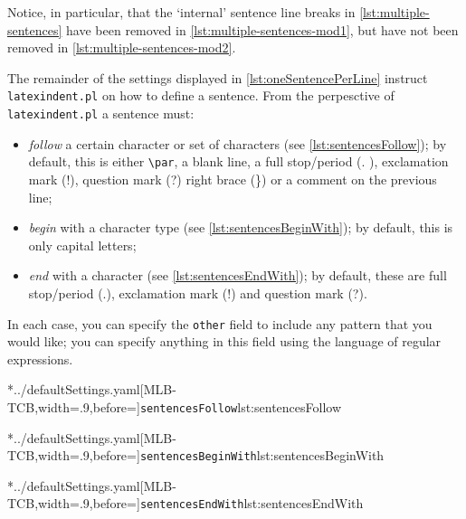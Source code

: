 	Notice, in particular, that the `internal' sentence line breaks in \cref{lst:multiple-sentences} have been removed in \cref{lst:multiple-sentences-mod1}, but have not been removed in \cref{lst:multiple-sentences-mod2}.

	The remainder of the settings displayed in \vref{lst:oneSentencePerLine} instruct \texttt{latexindent.pl} on how to define a sentence.
	From the perpesctive of \texttt{latexindent.pl} a sentence must: \begin{itemize} \item \emph{follow} a certain character or set of characters (see \cref{lst:sentencesFollow}); by default, this is either \lstinline!\par!, a blank line, a full stop/period (.
		      ), exclamation mark (!), question mark (?) right brace (\}) or a comment
		      on the previous line;
		\item \emph{begin} with a character type (see \cref{lst:sentencesBeginWith}); by default, this is only capital letters;
		\item \emph{end} with a character (see \cref{lst:sentencesEndWith}); by default, these are
		      full stop/period (.), exclamation mark (!) and question mark (?).
	\end{itemize}
	In each case, you can specify the \texttt{other} field to include any pattern that you would like; you can specify anything in this field using the language of regular expressions.

	\begin{adjustwidth}{-3.5cm}{-2.5cm}
		\begin{minipage}{.36\linewidth}
			\cmhlistingsfromfile*[style=sentencesFollow]*{../defaultSettings.yaml}[MLB-TCB,width=.9\linewidth,before=\centering]{\texttt{sentencesFollow}}{lst:sentencesFollow}
		\end{minipage}
		\hfill
		\begin{minipage}{.31\linewidth}
			\cmhlistingsfromfile*[style=sentencesBeginWith]*{../defaultSettings.yaml}[MLB-TCB,width=.9\linewidth,before=\centering]{\texttt{sentencesBeginWith}}{lst:sentencesBeginWith}
		\end{minipage}
		\hfill
		\begin{minipage}{.31\linewidth}
			\cmhlistingsfromfile*[style=sentencesEndWith]*{../defaultSettings.yaml}[MLB-TCB,width=.9\linewidth,before=\centering]{\texttt{sentencesEndWith}}{lst:sentencesEndWith}
		\end{minipage}
	\end{adjustwidth}

